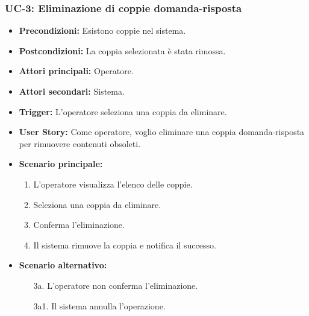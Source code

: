 \documentclass[a4paper, 12pt]{article}
\begin{document}
\subsubsection{UC-3: Eliminazione di coppie domanda-risposta}
\begin{itemize}
    \item \textbf{Precondizioni:} Esistono coppie nel sistema.
    \item \textbf{Postcondizioni:} La coppia selezionata è stata rimossa.
    \item \textbf{Attori principali:} Operatore.
    \item \textbf{Attori secondari:} Sistema.
    \item \textbf{Trigger:} L'operatore seleziona una coppia da eliminare.
    \item \textbf{User Story:} Come operatore, voglio eliminare una coppia domanda-risposta per rimuovere contenuti obsoleti.
    \item \textbf{Scenario principale:}
    \begin{enumerate}
        \item L'operatore visualizza l'elenco delle coppie.
        \item Seleziona una coppia da eliminare.
        \item Conferma l'eliminazione.
        \item Il sistema rimuove la coppia e notifica il successo.
    \end{enumerate}
    \item \textbf{Scenario alternativo:}
    \begin{enumerate}
        \item[3a.] L'operatore non conferma l'eliminazione.
        \item[3a1.] Il sistema annulla l'operazione.
    \end{enumerate}
\end{itemize}
\end{document}
